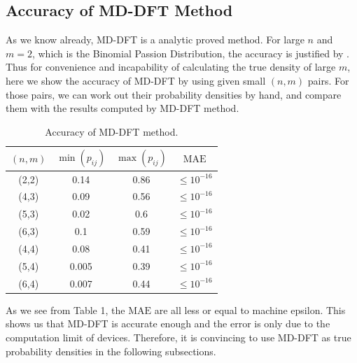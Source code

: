 \documentclass[12pt]{article}
\begin{document}
\subsection{Accuracy of MD-DFT Method}
As we know already, MD-DFT is a analytic proved method. For large $n$ and $m=2$, which is the Binomial Passion Distribution, the accuracy is justified by . Thus for convenience and incapability of calculating the true density of large $m$, here we show the accuracy of MD-DFT by using given small $(n,m)$ pairs. For those pairs, we can work out their probability densities by hand, and compare them with the results computed by MD-DFT method.
\begin{table}%
\centering
\caption{Accuracy of MD-DFT method.}\label{tab:my_label}
\vspace{1ex}
\begin{tabular}{c|c|c|c}
\hline\hline
     $(n,m)$ & $\min (p_{i j})$ & $\max (p_{i j})$ & $\mathrm{MAE}$ \\
\hline
    (2,2) & 0.14 & 0.86 & $\leq 10^{-16}$\\
\hline
    (4,3) &0.09 &0.56 & $\leq 10^{-16}$\\
\hline
    (5,3) &0.02 &0.6 &$\leq 10^{-16}$\\
\hline
    (6,3) &0.1 &0.59 &$\leq 10^{-16}$\\
\hline
    (4,4) &0.08 &0.41 &$\leq 10^{-16}$\\
\hline
    (5,4) &0.005 &0.39 &$\leq 10^{-16}$\\
\hline
    (6,4) &0.007 &0.44 &$\leq 10^{-16}$\\
\hline\hline
\end{tabular}

\end{table}
As we see from Table 1, the $\mathrm{MAE}$ are all less or equal to machine epsilon. This shows us that MD-DFT is accurate enough and the error is only due to the computation limit of devices. Therefore, it is convincing to use MD-DFT as true probability densities in the following subsections.
\end{document}
